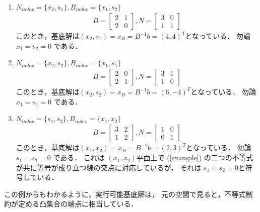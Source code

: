 \documentclass[11pt, a4]{article}
\begin{document}
\begin{enumerate}
\item $N_{index} = \{x_2, s_1\}, B_{index} = \{x_1, s_2\}$
  \begin{eqnarray}
  B =
  \left[
  \begin{array}{cc}
    2&1\\
    2&0
  \end{array}
  \right]
  ,    
  N =
  \left[
  \begin{array}{cc}
    3&0\\
    1&1
  \end{array}
  \right]
\end{eqnarray}
このとき，基底解は$(x_2, s_1) = x_B = B^{-1}b = (4, 4)^T$となっている．
勿論 $x_1 = s_2 = 0$ である．

\item $N_{index} = \{x_2, s_2\}, B_{index} = \{x_1, s_1\}$
  \begin{eqnarray}
  B =
  \left[
  \begin{array}{cc}
    2&0\\
    2&1
  \end{array}
  \right]
  ,    
  N =
  \left[
  \begin{array}{cc}
    3&1\\
    1&0
  \end{array}
  \right]
\end{eqnarray}
このとき，基底解は$(x_2, s_2) = x_B = B^{-1}b = (6, -4)^T$となっている．
勿論 $x_1 = s_1 = 0$ である．

\item $N_{index} = \{s_1, s_2\}, B_{index} = \{x_1, x_2\}$
  \begin{eqnarray}
  B =
  \left[
  \begin{array}{cc}
    3&2\\
    1&2
  \end{array}
  \right]
  ,    
  N =
  \left[
  \begin{array}{cc}
    1&0\\
    0&1
  \end{array}
  \right]
\end{eqnarray}
このとき，基底解は$(x_1, x_2) = x_B = B^{-1}b = (2, 3)^T$となっている．
勿論 $s_1 = s_2 = 0$ である．
これは $(x_1, x_2)$平面上で (\ref{example}) の二つの不等式が共に等号が成り立つ線の交点に対応しているが，
それは $s_1 = s_2 = 0$と符号している．
\end{enumerate}

この例からもわかるように，実行可能基底解は，
元の空間で見ると，不等式制約が定める凸集合の端点に相当している．
\end{document}
